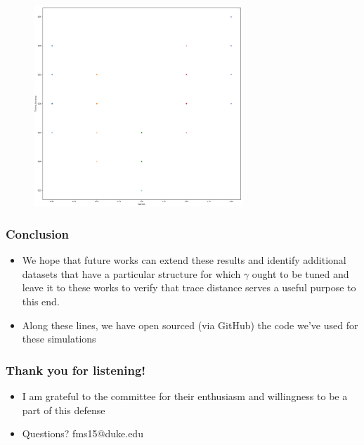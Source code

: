 \documentclass{beamer}
\newcommand\0{\mathbf{0}}
\newcommand\<{\langle}
\renewcommand\>{\rangle}
\begin{document}
\begin{frame}

\begin{figure}[H]
\centering
\includegraphics[width=0.7\textwidth]{images/moons_gammas_training}	
\end{figure}
\end{frame}

\begin{frame}
\frametitle{Conclusion}
\begin{itemize}
\item We hope that future works can extend these results and identify additional datasets that have a particular structure for which $\gamma$ ought to be tuned and leave it to these works to verify that trace distance serves a useful purpose to this end.
\item Along these lines, we have open sourced (via GitHub) the code we've used for these simulations
\end{itemize}
\end{frame}

\begin{frame}
\frametitle{Thank you for listening!}
\begin{itemize}
\item I am grateful to the committee for their enthusiasm and willingness to be a part of this defense
\item Questions? fms15@duke.edu
\end{itemize}
\end{frame}


 
\end{document}
